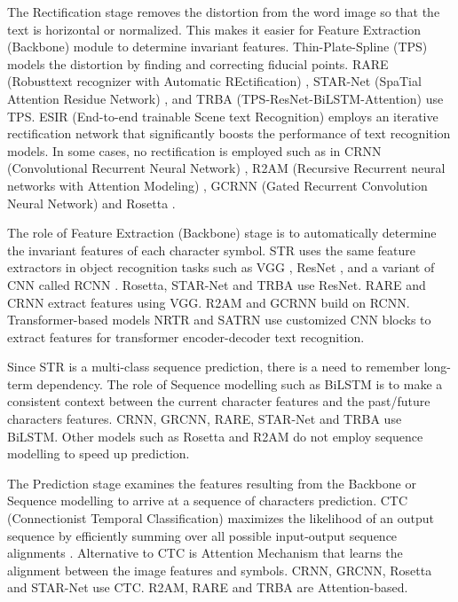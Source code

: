 \documentclass[runningheads]{llncs}
\begin{document}
The Rectification stage removes the distortion from the word image so that the text is horizontal or normalized. This makes it easier for Feature Extraction (Backbone) module to determine invariant features. Thin-Plate-Spline (TPS) \cite{bookstein1989principal} models the distortion by finding and correcting fiducial points. RARE (Robusttext recognizer with Automatic REctification) \cite{shi2016robust}, STAR-Net (SpaTial Attention Residue Network) \cite{liu2016star}, and TRBA (TPS-ResNet-BiLSTM-Attention) \cite{baek2019wrong} use TPS. ESIR (End-to-end trainable Scene text Recognition) \cite{zhan2019esir} employs an iterative rectification network that significantly boosts the performance of text recognition models. In some cases, no rectification is employed such as in CRNN (Convolutional Recurrent Neural Network) \cite{shi2016end}, R2AM (Recursive Recurrent neural networks with Attention Modeling) \cite{lee2016recursive}, GCRNN (Gated Recurrent Convolution Neural Network) \cite{wang2017gated} and Rosetta \cite{borisyuk2018rosetta}.

The role of Feature Extraction (Backbone) stage is to automatically determine the invariant features of each character symbol. STR uses the same feature extractors in object recognition tasks such as VGG \cite{simonyan2014very}, ResNet \cite{he2016deep}, and a variant of CNN called RCNN \cite{lee2016recursive}. Rosetta,  STAR-Net and TRBA use ResNet. RARE and CRNN  extract features using VGG. R2AM and GCRNN build on RCNN. Transformer-based models NRTR and SATRN use customized CNN blocks to extract features for transformer encoder-decoder text recognition.

Since STR is a multi-class sequence prediction, there is a need to remember long-term dependency. The role of Sequence modelling such as BiLSTM is to make a consistent context between the current character features and the past/future characters features. CRNN, GRCNN, RARE, STAR-Net and TRBA use BiLSTM. Other models such as Rosetta and R2AM do not employ sequence modelling to speed up prediction.

The Prediction stage examines the features resulting from the Backbone or Sequence modelling to arrive at a sequence of characters prediction. CTC (Connectionist Temporal Classification) \cite{graves2006connectionist}  maximizes the likelihood of an output sequence by efficiently summing over all possible input-output sequence alignments \cite{chen2020text}. Alternative to CTC is Attention Mechanism \cite{bahdanau2014neural} that learns the alignment between the image features and symbols. CRNN, GRCNN, Rosetta and STAR-Net use CTC. R2AM, RARE and TRBA are Attention-based.
\end{document}
